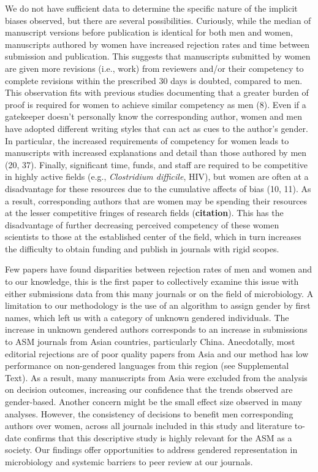 \documentclass[11pt,]{article}
\begin{document}
We do not have sufficient data to determine the specific nature of the
implicit biases observed, but there are several possibilities.
Curiously, while the median of manuscript versions before publication is
identical for both men and women, manuscripts authored by women have
increased rejection rates and time between submission and publication.
This suggests that manuscripts submitted by women are given more
revisions (i.e., work) from reviewers and/or their competency to
complete revisions within the prescribed 30 days is doubted, compared to
men. This observation fits with previous studies documenting that a
greater burden of proof is required for women to achieve similar
competency as men (8). Even if a gatekeeper doesn't personally know the
corresponding author, women and men have adopted different writing
styles that can act as cues to the author's gender. In particular, the
increased requirements of competency for women leads to manuscripts with
increased explanations and detail than those authored by men (20, 37).
Finally, significant time, funds, and staff are required to be
competitive in highly active fields (e.g., \emph{Clostridium difficile},
HIV), but women are often at a disadvantage for these resources due to
the cumulative affects of bias (10, 11). As a result, corresponding
authors that are women may be spending their resources at the lesser
competitive fringes of research fields (\textbf{citation}). This has the
disadvantage of further decreasing perceived competency of these women
scientists to those at the established center of the field, which in
turn increases the difficulty to obtain funding and publish in journals
with rigid scopes.

Few papers have found disparities between rejection rates of men and
women and to our knowledge, this is the first paper to collectively
examine this issue with either submissions data from this many journals
or on the field of microbiology. A limitation to our methodology is the
use of an algorithm to assign gender by first names, which left us with
a category of unknown gendered individuals. The increase in unknown
gendered authors corresponds to an increase in submissions to ASM
journals from Asian countries, particularly China. Anecdotally, most
editorial rejections are of poor quality papers from Asia and our method
has low performance on non-gendered languages from this region (see
Supplemental Text). As a result, many manuscripts from Asia were
excluded from the analysis on decision outcomes, increasing our
confidence that the trends observed are gender-based. Another concern
might be the small effect size observed in many analyses. However, the
consistency of decisions to benefit men corresponding authors over
women, across all journals included in this study and literature to-date
confirms that this descriptive study is highly relevant for the ASM as a
society. Our findings offer opportunities to address gendered
representation in microbiology and systemic barriers to peer review at
our journals.
\end{document}
